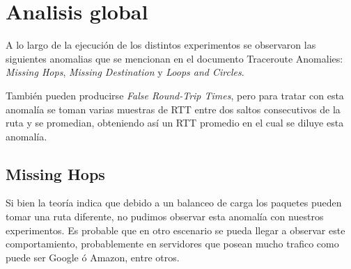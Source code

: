 \section{Analisis global}
A lo largo de la ejecución de los distintos experimentos se observaron las siguientes anomalias que se mencionan en el documento Traceroute Anomalies:
\emph{Missing Hops}, \emph{Missing Destination} y \emph{Loops and Circles}.

También pueden producirse \emph{False Round-Trip Times}, pero para tratar con esta anomalía se toman varias muestras de RTT entre dos saltos consecutivos de la ruta y se promedian, obteniendo así un RTT promedio en el cual se diluye esta anomalía.

\subsection{Missing Hops}

Si bien la teoría indica que debido a un balanceo de carga los paquetes pueden tomar una ruta diferente, no pudimos observar esta anomalía
con nuestros experimentos. Es probable que en otro escenario se pueda llegar a observar	este comportamiento, probablemente en servidores
que posean mucho trafico como puede ser Google ó Amazon, entre otros.
